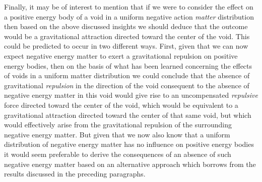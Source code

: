 \documentclass[notitlepage,12pt]{report}
\begin{document}
\noindent Finally, it may be of interest to mention that if we were to consider the effect on a positive energy body of a void in a uniform negative action \textit{matter} distribution then based on the above discussed insights we should deduce that the outcome would be a gravitational attraction directed toward the center of the void. This could be predicted to occur in two different ways. First, given that we can now expect negative energy matter to exert a gravitational repulsion on positive energy bodies, then on the basis of what has been learned concerning the effects of voids in a uniform matter distribution we could conclude that the absence of gravitational \textit{repulsion} in the direction of the void consequent to the absence of negative energy matter in this void would give rise to an uncompensated \textit{repulsive} force directed toward the center of the void, which would be equivalent to a gravitational attraction directed toward the center of that same void, but which would effectively arise from the gravitational repulsion of the surrounding negative energy matter. But given that we now also know that a uniform distribution of negative energy matter has no influence on positive energy bodies it would seem preferable to derive the consequences of an absence of such negative energy matter based on an alternative approach which borrows from the results discussed in the preceding paragraphs.
\end{document}
